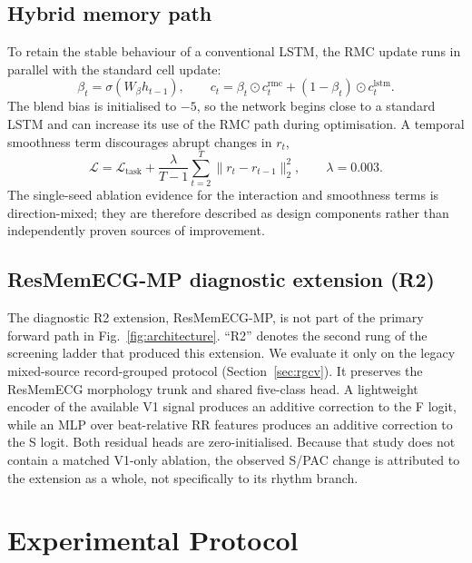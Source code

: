 \documentclass[review,12pt]{elsarticle}
\begin{document}
\subsection{Hybrid memory path}
To retain the stable behaviour of a conventional LSTM, the RMC update runs in
parallel with the standard cell update:
\begin{equation}
\beta_t=\sigma(W_\beta h_{t-1}),\qquad
c_t=\beta_t\odot c_t^{\mathrm{rmc}}+(1-\beta_t)\odot c_t^{\mathrm{lstm}}.
\end{equation}
The blend bias is initialised to $-5$, so the network begins close to a standard
LSTM and can increase its use of the RMC path during optimisation. A temporal
smoothness term discourages abrupt changes in $r_t$,
\begin{equation}
\mathcal{L}=\mathcal{L}_{\mathrm{task}}+
\frac{\lambda}{T-1}\sum_{t=2}^{T}\lVert r_t-r_{t-1}\rVert_2^2,
\qquad \lambda=0.003.
\end{equation}
The single-seed ablation evidence for the interaction and smoothness terms is
direction-mixed; they are therefore described as design components rather than
independently proven sources of improvement.

\subsection{ResMemECG-MP diagnostic extension (R2)}
The diagnostic R2 extension, ResMemECG-MP, is not part of the primary forward
path in Fig.~\ref{fig:architecture}. ``R2'' denotes the second rung of the
screening ladder that produced this extension. We evaluate it only on the
legacy mixed-source record-grouped protocol
(Section~\ref{sec:rgcv}). It preserves the ResMemECG morphology trunk and shared
five-class head. A lightweight encoder of the available V1 signal produces an
additive correction to the F logit, while an MLP over beat-relative RR features
produces an additive correction to the S logit. Both residual heads are
zero-initialised. Because that study does not contain a matched V1-only
ablation, the observed S/PAC change is attributed to the extension as a whole,
not specifically to its rhythm branch.

\section{Experimental Protocol}
\end{document}
